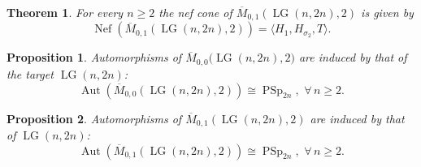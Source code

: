 \documentclass[10pt,a4paper]{amsart}
\newtheorem{theorem}{Theorem}
\newtheorem{proposition}{Proposition}
\newcommand{\Aut}{\operatorname{Aut}}
\newcommand{\LG}{\operatorname{LG}}
\DeclareMathOperator{\PSp}{PSp}
\begin{document}
\begin{theorem}\label{thm:nef-pointed-conics-LG}
For every $n\ge 2$ the nef cone of $\overline{M}_{0,1}(\LG(n,2n),2)$ is given by
\[
\operatorname{Nef}(\overline{M}_{0,1}(\LG(n,2n),2))
=
\langle H_1, H_{\sigma_2}, T\rangle.
\]
\end{theorem}

\begin{proposition}\label{prop:AutKontsevichConicsLG}
Automorphisms of $\overline{M}_{0,0}\big(\LG(n,2n),2\big)$ are induced by that of the target $\LG(n,2n)$:
\[
\Aut(\overline{M}_{0,0}(\LG(n,2n),2))\cong\PSp_{2n},\,\,\forall\, n\geq2.
\]
\end{proposition}

\begin{proposition}\label{prop:AutKontsevichConicsLGpointed}
Automorphisms of $\overline{M}_{0,1}(\LG(n,2n),2)$ are induced by that of $\LG(n,2n)$:
\[
\Aut(\overline{M}_{0,1}(\LG(n,2n),2))\cong\PSp_{2n},\,\,\forall\,n\geq 2.
\]
\end{proposition}
\end{document}
